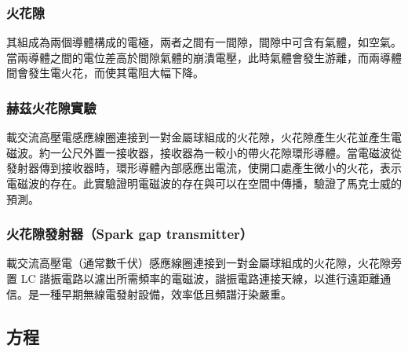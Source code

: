 \documentclass[a4paper,12pt]{report}
\begin{document}
\begin{itemize}
\subsubsection{火花隙}
其組成為兩個導體構成的電極，兩者之間有一間隙，間隙中可含有氣體，如空氣。當兩導體之間的電位差高於間隙氣體的崩潰電壓，此時氣體會發生游離，而兩導體間會發生電火花，而使其電阻大幅下降。
\subsubsection{赫茲火花隙實驗}
載交流高壓電感應線圈連接到一對金屬球組成的火花隙，火花隙產生火花並產生電磁波。約一公尺外置一接收器，接收器為一較小的帶火花隙環形導體。當電磁波從發射器傳到接收器時，環形導體內部感應出電流，使開口處產生微小的火花，表示電磁波的存在。此實驗證明電磁波的存在與可以在空間中傳播，驗證了馬克士威的預測。
\subsubsection{火花隙發射器（Spark gap transmitter）}
載交流高壓電（通常數千伏）感應線圈連接到一對金屬球組成的火花隙，火花隙旁置 LC 諧振電路以濾出所需頻率的電磁波，諧振電路連接天線，以進行遠距離通信。是一種早期無線電發射設備，效率低且頻譜汙染嚴重。
\subsection{方程}

\end{itemize}
\end{document}
